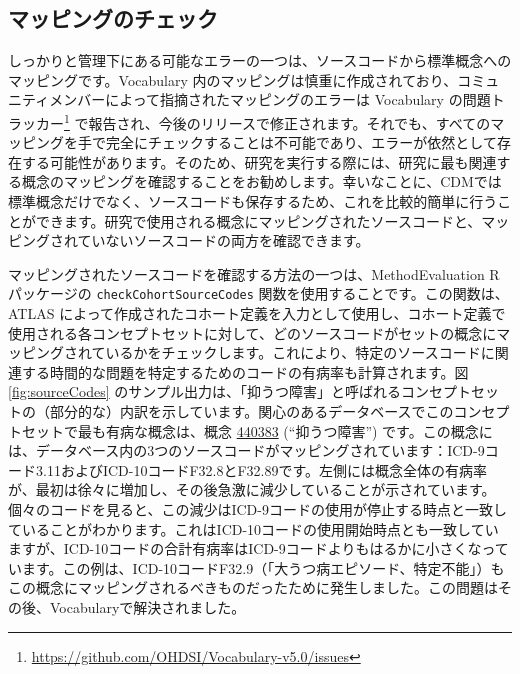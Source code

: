 \documentclass[
  11pt]{book}
\theoremstyle{definition}
\theoremstyle{definition}
\theoremstyle{definition}
\theoremstyle{definition}
\theoremstyle{remark}
\begin{document}
\subsection{マッピングのチェック}\label{ux30deux30c3ux30d4ux30f3ux30b0ux306eux30c1ux30a7ux30c3ux30af}

しっかりと管理下にある可能なエラーの一つは、ソースコードから標準概念へのマッピングです。Vocabulary 内のマッピングは慎重に作成されており、コミュニティメンバーによって指摘されたマッピングのエラーは Vocabulary の問題トラッカー\footnote{\url{https://github.com/OHDSI/Vocabulary-v5.0/issues}} で報告され、今後のリリースで修正されます。それでも、すべてのマッピングを手で完全にチェックすることは不可能であり、エラーが依然として存在する可能性があります。そのため、研究を実行する際には、研究に最も関連する概念のマッピングを確認することをお勧めします。幸いなことに、CDMでは標準概念だけでなく、ソースコードも保存するため、これを比較的簡単に行うことができます。研究で使用される概念にマッピングされたソースコードと、マッピングされていないソースコードの両方を確認できます。

マッピングされたソースコードを確認する方法の一つは、MethodEvaluation R パッケージの \texttt{checkCohortSourceCodes} 関数を使用することです。この関数は、ATLAS によって作成されたコホート定義を入力として使用し、コホート定義で使用される各コンセプトセットに対して、どのソースコードがセットの概念にマッピングされているかをチェックします。これにより、特定のソースコードに関連する時間的な問題を特定するためのコードの有病率も計算されます。図 \ref{fig:sourceCodes} のサンプル出力は、「抑うつ障害」と呼ばれるコンセプトセットの（部分的な）内訳を示しています。関心のあるデータベースでこのコンセプトセットで最も有病な概念は、概念 \href{http://athena.ohdsi.org/search-terms/terms/440383}{440383} (``抑うつ障害'') です。この概念には、データベース内の3つのソースコードがマッピングされています：ICD-9コード3.11およびICD-10コードF32.8とF32.89です。左側には概念全体の有病率が、最初は徐々に増加し、その後急激に減少していることが示されています。個々のコードを見ると、この減少はICD-9コードの使用が停止する時点と一致していることがわかります。これはICD-10コードの使用開始時点とも一致していますが、ICD-10コードの合計有病率はICD-9コードよりもはるかに小さくなっています。この例は、ICD-10コードF32.9（「大うつ病エピソード、特定不能」）もこの概念にマッピングされるべきものだったために発生しました。この問題はその後、Vocabularyで解決されました。
\end{document}

